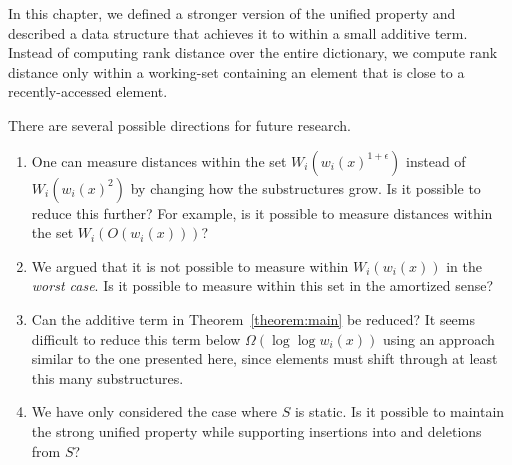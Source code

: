 \documentclass{llncs}
\newcommand{\BigOh}[1]{O\!\left(#1\right)}
\newcommand{\BigOmega}[1]{\Omega\!\left(#1\right)}
\begin{document}
In this chapter, we defined a stronger version of the unified property and described a data structure that achieves it to within a small additive term. Instead of computing rank distance over the entire dictionary, we compute rank distance only within a working-set containing an element that is close to a recently-accessed element.

There are several possible directions for future research.

\begin{enumerate}
\item One can measure distances within the set $W_i(w_i(x)^{1+\epsilon})$ instead of $W_i(w_i(x)^2)$ by changing how the substructures grow. Is it possible to reduce this further? For example, is it possible to measure distances within the set $W_i(\BigOh{w_i(x)})$?

\item We argued that it is not possible to measure within $W_i(w_i(x))$ in the \emph{worst case}. Is it possible to measure within this set in the amortized sense?

\item Can the additive term in Theorem~\ref{theorem:main} be reduced? It seems difficult to reduce this term below $\BigOmega{\log \log w_i(x)}$ using an approach similar to the one presented here, since elements must shift through at least this many substructures.

\item We have only considered the case where $S$ is static. Is it possible to maintain the strong unified property while supporting insertions into and deletions from $S$?
\end{enumerate}



%



%
%
%
%
%
%
%
\end{document}
